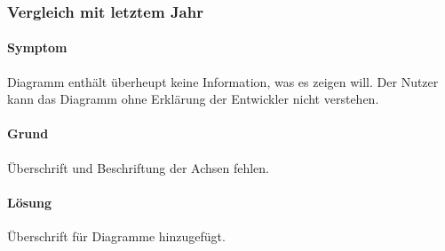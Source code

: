 \subsubsection{Vergleich mit letztem Jahr}
\paragraph{Symptom}

Diagramm enthält überheupt keine Information, was es zeigen will. Der Nutzer kann das Diagramm ohne Erklärung der Entwickler nicht verstehen.


\paragraph{Grund}
Überschrift und Beschriftung der Achsen fehlen.

\paragraph{Lösung}
Überschrift für Diagramme hinzugefügt.


